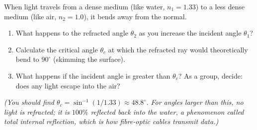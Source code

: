 \begin{whiteboard}
When light travels from a dense medium (like water, $n_1 = 1.33$) to a less dense medium (like air, $n_2 = 1.0$), it bends away from the normal.
\begin{enumerate}[label=(\alph*), leftmargin=2.5em, itemsep=1pt]
  \item What happens to the refracted angle $\theta_2$ as you increase the incident angle $\theta_1$?
  \item Calculate the critical angle $\theta_c$ at which the refracted ray would theoretically bend to $90^\circ$ (skimming the surface).
  \item What happens if the incident angle is greater than $\theta_c$? As a group, decide: does any light escape into the air?
\end{enumerate}
\textit{(You should find $\theta_c = \sin^{-1}(1/1.33) \approx 48.8^\circ$. For angles larger than this, no light is refracted; it is $100\%$ reflected back into the water, a phenomenon called total internal reflection, which is how fibre-optic cables transmit data.)}
\end{whiteboard}
